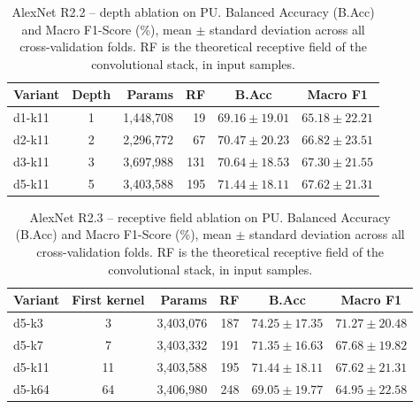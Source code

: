 \begin{table}[ht]
\centering
\caption{AlexNet R2.2 -- depth ablation on PU. Balanced Accuracy (B.Acc) and Macro F1-Score (\%), mean $\pm$ standard deviation across all cross-validation folds. RF is the theoretical receptive field of the convolutional stack, in input samples.}
\label{tab:ablation_alexnet_depth_pu}
\begin{tabular}{@{}l c r r c c@{}}
\toprule
\textbf{Variant} & \textbf{Depth} & \textbf{Params} & \textbf{RF} & \textbf{B.Acc} & \textbf{Macro F1} \\ \midrule
d1-k11 & 1 & 1,448,708 & 19 & $69.16 \pm 19.01$ & $65.18 \pm 22.21$ \\
d2-k11 & 2 & 2,296,772 & 67 & $70.47 \pm 20.23$ & $66.82 \pm 23.51$ \\
d3-k11 & 3 & 3,697,988 & 131 & $70.64 \pm 18.53$ & $67.30 \pm 21.55$ \\
d5-k11 & 5 & 3,403,588 & 195 & $71.44 \pm 18.11$ & $67.62 \pm 21.31$ \\
\bottomrule
\end{tabular}
\end{table}

\begin{table}[ht]
\centering
\caption{AlexNet R2.3 -- receptive field ablation on PU. Balanced Accuracy (B.Acc) and Macro F1-Score (\%), mean $\pm$ standard deviation across all cross-validation folds. RF is the theoretical receptive field of the convolutional stack, in input samples.}
\label{tab:ablation_alexnet_kernel_pu}
\begin{tabular}{@{}l c r r c c@{}}
\toprule
\textbf{Variant} & \textbf{First kernel} & \textbf{Params} & \textbf{RF} & \textbf{B.Acc} & \textbf{Macro F1} \\ \midrule
d5-k3 & 3 & 3,403,076 & 187 & $74.25 \pm 17.35$ & $71.27 \pm 20.48$ \\
d5-k7 & 7 & 3,403,332 & 191 & $71.35 \pm 16.63$ & $67.68 \pm 19.82$ \\
d5-k11 & 11 & 3,403,588 & 195 & $71.44 \pm 18.11$ & $67.62 \pm 21.31$ \\
d5-k64 & 64 & 3,406,980 & 248 & $69.05 \pm 19.77$ & $64.95 \pm 22.58$ \\
\bottomrule
\end{tabular}
\end{table}

